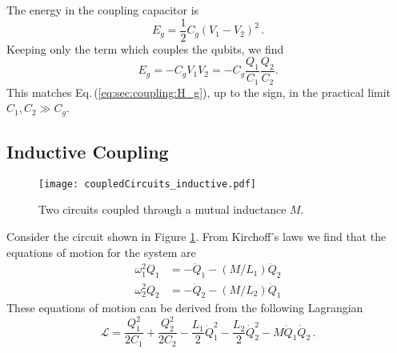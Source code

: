 The energy in the coupling capacitor is
\begin{equation}
E_g = \frac{1}{2} C_g \left( V_1 - V_2 \right)^2 \, . \nonumber
\end{equation}
Keeping only the term which couples the qubits, we find \begin{equation}
E_g = -C_g V_1 V_2 = -C_g \frac{Q_1}{C_1} \frac{Q_2}{C_2} . \end{equation}
This matches Eq.\,(\ref{eq:sec:coupling:H_g}), up to the sign, in the practical limit $C_1,C_2 \gg C_g$.

\subsection{Inductive Coupling}

\begin{figure}
\begin{centering}
\texttt{[image: coupledCircuits\_inductive.pdf]}
\par\end{centering}
\caption{Two circuits coupled through a mutual inductance $M$.}
\label{Fig:coupledCircuits_inductive}
\end{figure}


Consider the circuit shown in Figure \ref{Fig:coupledCircuits_inductive}.
From Kirchoff's laws we find that the equations of motion for the system are
\begin{align}
\omega_1^2 Q_1 &= -\ddot{Q}_1 - \left(M/L_1\right) \ddot{Q}_2 \\
\omega_2^2 Q_2 &= -\ddot{Q}_2 - \left(M/L_2\right) \ddot{Q}_1
\end{align}
These equations of motion can be derived from the following Lagrangian
\begin{equation}
\mathcal{L} = \frac{Q_1^2}{2 C_1} + \frac{Q_2^2}{2 C_2}
- \frac{L_1}{2}\dot{Q}_1^2
- \frac{L_2}{2}\dot{Q}_2^2
- M \dot{Q}_1 \dot{Q}_2 \, . \label{eq:sec.coupling.subsec.inductiveCoupling:Lagrangian}
\end{equation}


